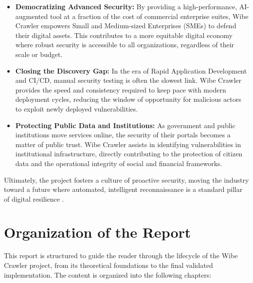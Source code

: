 \documentclass[12pt,oneside,a4paper]{book}
\begin{document}
\begin{itemize}
    \item \textbf{Democratizing Advanced Security:} By providing a high-performance, AI-augmented tool at a fraction of the cost of commercial enterprise suites, Wibe Crawler empowers Small and Medium-sized Enterprises (SMEs) to defend their digital assets. This contributes to a more equitable digital economy where robust security is accessible to all organizations, regardless of their scale or budget.
    \item \textbf{Closing the Discovery Gap:} In the era of Rapid Application Development and CI/CD, manual security testing is often the slowest link. Wibe Crawler provides the speed and consistency required to keep pace with modern deployment cycles, reducing the window of opportunity for malicious actors to exploit newly deployed vulnerabilities.
    \item \textbf{Protecting Public Data and Institutions:} As government and public institutions move services online, the security of their portals becomes a matter of public trust. Wibe Crawler assists in identifying vulnerabilities in institutional infrastructure, directly contributing to the protection of citizen data and the operational integrity of social and financial frameworks.
\end{itemize}
Ultimately, the project fosters a culture of proactive security, moving the industry toward a future where automated, intelligent reconnaissance is a standard pillar of digital resilience \cite{das2021, rehman2022}.

\section{Organization of the Report}

This report is structured to guide the reader through the lifecycle of the Wibe Crawler project, from its theoretical foundations to the final validated implementation. The content is organized into the following chapters:
\end{document}
